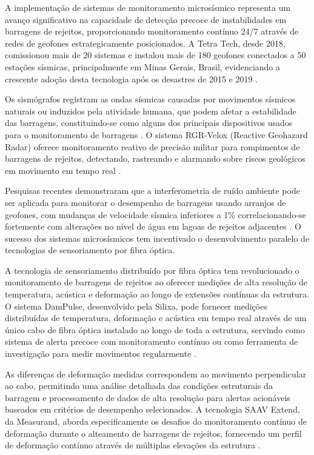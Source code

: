 A implementação de sistemas de monitoramento microsísmico representa um avanço significativo na capacidade de detecção precoce de instabilidades em barragens de rejeitos, proporcionando monitoramento contínuo 24/7 através de redes de geofones estrategicamente posicionados. A Tetra Tech, desde 2018, comissionou mais de 20 sistemas e instalou mais de 180 geofones conectados a 50 estações sísmicas, principalmente em Minas Gerais, Brasil, evidenciando a crescente adoção desta tecnologia após os desastres de 2015 e 2019 \cite{tetratech2023mitigating}.

Os sismógrafos registram as ondas sísmicas causadas por movimentos sísmicos naturais ou induzidos pela atividade humana, que podem afetar a estabilidade das barragens, constituindo-se como alguns dos principais dispositivos usados para o monitoramento de barragens \cite{sequencia2024sismografico}. O sistema RGR-Velox (Reactive Geohazard Radar) oferece monitoramento reativo de precisão militar para rompimentos de barragens de rejeitos, detectando, rastreando e alarmando sobre riscos geológicos em movimento em tempo real \cite{internationalmining2024tailings}.

Pesquisas recentes demonstraram que a interferometria de ruído ambiente pode ser aplicada para monitorar o desempenho de barragens usando arranjos de geofones, com mudanças de velocidade sísmica inferiores a 1\% correlacionando-se fortemente com alterações no nível de água em lagoas de rejeitos adjacentes \cite{naturecomm2022monitoring}. O sucesso dos sistemas microsísmicos tem incentivado o desenvolvimento paralelo de tecnologias de sensoriamento por fibra óptica.

A tecnologia de sensoriamento distribuído por fibra óptica tem revolucionado o monitoramento de barragens de rejeitos ao oferecer medições de alta resolução de temperatura, acústica e deformação ao longo de extensões contínuas da estrutura. O sistema DamPulse, desenvolvido pela Silixa, pode fornecer medições distribuídas de temperatura, deformação e acústica em tempo real através de um único cabo de fibra óptica instalado ao longo de toda a estrutura, servindo como sistema de alerta precoce com monitoramento contínuo ou como ferramenta de investigação para medir movimentos regularmente \cite{silixa2024dampulse}.

As diferenças de deformação medidas correspondem ao movimento perpendicular ao cabo, permitindo uma análise detalhada das condições estruturais da barragem e processamento de dados de alta resolução para alertas acionáveis baseados em critérios de desempenho selecionados. A tecnologia SAAV Extend, da Measurand, aborda especificamente os desafios do monitoramento contínuo de deformação durante o alteamento de barragens de rejeitos, fornecendo um perfil de deformação contínuo através de múltiplas elevações da estrutura \cite{rstinstruments2022tailings}.

